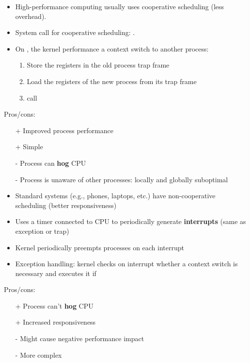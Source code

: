 \begin{itemize}
    \item High-performance computing usually uses cooperative scheduling (less overhead).
    \item System call for cooperative scheduling: .
    \item On , the kernel performance a context switch to another process:
          \begin{enumerate}
              \item Store the registers in the old process trap frame
              \item Load the registers of the new process from its trap frame
              \item call 
          \end{enumerate}
\end{itemize}
Pros/cons:
\begin{itemize}
    \item[+] Improved process performance
    \item[+] Simple
    \item[-] Process can \textbf{hog} CPU
    \item[-] Process is unaware of other processes: locally and globally suboptimal
\end{itemize}

\newpar{}
\begin{itemize}
    \item Standard systems (e.g., phones, laptops, etc.) have non-cooperative scheduling (better responsiveness)
    \item Uses a timer connected to CPU to periodically generate \textbf{interrupts} (same as exception or trap)
    \item Kernel periodically preempts processes on each interrupt
    \item Exception handling: kernel checks on interrupt whether a context switch is necessary and executes it if
\end{itemize}
Pros/cons:
\begin{itemize}
    \item[+] Process can't \textbf{hog} CPU
    \item[+] Increased responsiveness
    \item[-] Might cause negative performance impact
    \item[-] More complex
\end{itemize}

